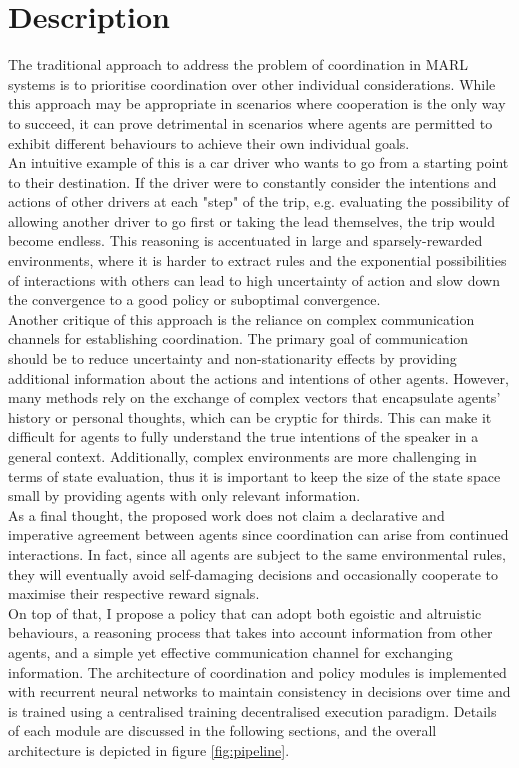 \documentclass[a4paper,singleside,12pt]{report} %
\begin{document}
\section{Description}\label{description}
The traditional approach to address the problem of coordination in MARL systems is to prioritise coordination over other individual considerations. While this approach may be appropriate in scenarios where cooperation is the only way to succeed, it can prove detrimental in scenarios where agents are permitted to exhibit different behaviours to achieve their own individual goals.\\
An intuitive example of this is a car driver who wants to go from a starting point to their destination. If the driver were to constantly consider the intentions and actions of other drivers at each "step" of the trip, e.g. evaluating the possibility of allowing another driver to go first or taking the lead themselves, the trip would become endless. This reasoning is accentuated in large and sparsely-rewarded environments, where it is harder to extract rules and the exponential possibilities of interactions with others can lead to high uncertainty of action and slow down the convergence to a good policy or suboptimal convergence.\\
Another critique of this approach is the reliance on complex communication channels for establishing coordination. The primary goal of communication should be to reduce uncertainty and non-stationarity effects by providing additional information about the actions and intentions of other agents. However, many methods rely on the exchange of complex vectors that encapsulate agents' history or personal thoughts, which can be cryptic for thirds. This can make it difficult for agents to fully understand the true intentions of the speaker in a general context. Additionally, complex environments are more challenging in terms of state evaluation, thus it is important to keep the size of the state space small by providing agents with only relevant information.\\
As a final thought, the proposed work does not claim a declarative and imperative agreement between agents since coordination can arise from continued interactions. In fact, since all agents are subject to the same environmental rules, they will eventually avoid self-damaging decisions and occasionally cooperate to maximise their respective reward signals.\\
On top of that, I propose a policy that can adopt both egoistic and altruistic behaviours, a reasoning process that takes into account information from other agents, and a simple yet effective communication channel for exchanging information. The architecture of coordination and policy modules is implemented with recurrent neural networks to maintain consistency in decisions over time and is trained using a centralised training decentralised execution paradigm. Details of each module are discussed in the following sections, and the overall architecture is depicted in figure \ref{fig:pipeline}.
\end{document}
